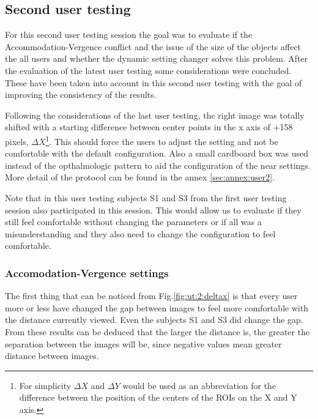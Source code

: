 \documentclass[10pt,a4paper,twocolumn,twoside]{article}
\begin{document}
	
	\subsection{Second user testing}
	
	For this second user testing session the goal was to evaluate if the Accommodation-Vergence conflict and the issue of the size of the objects affect the all users and whether the dynamic setting changer solves this problem. After the evaluation of the latest user testing some considerations were concluded. These have been taken into account in this second user testing with the goal of improving the consistency of the results. 
	
	Following the considerations of the last user testing, the right image was totally shifted with a starting difference between center points in the x axis of +158 pixels, $\Delta X$\footnote{For simplicity  $\Delta X$ and $\Delta Y$ would be used as an abbreviation for the difference between the position of the centers of the ROIs on the X and Y axis. }. This should force the users to adjust the setting and not be comfortable with the default configuration. Also a small cardboard box was used instead of the opthalmologic pattern to aid the configuration of the near settings. More detail of the protocol can be found in the annex \ref{sec:annex:user2}.
	
	Note that in this user testing subjects S1 and S3 from the first user testing session also participated in this session. This would allow us to evaluate if they still feel comfortable without changing the parameters or if all was a misunderstanding and they also need to change the configuration to feel comfortable. 
	
	\subsubsection{Accomodation-Vergence settings}
	The first thing that can be noticed from Fig.\ref{fig:ut:2:deltax} is that every user more or less have changed the gap between images to feel more comfortable with the distance currently viewed. Even the subjects S1 and S3 did change the gap. From these results can be deduced that the larger the distance is, the greater the separation between the images will be, since negative values mean greater distance between images. 
	
\end{document}
